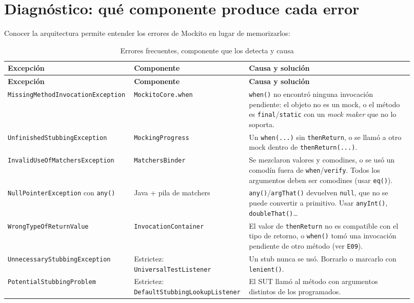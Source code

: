 \documentclass[11pt,a4paper,oneside]{report}
\newcommand{\code}[1]{\texttt{#1}}
\begin{document}
\section{Diagnóstico: qué componente produce cada error}
Conocer la arquitectura permite entender los errores de Mockito en lugar de memorizarlos:

\begin{longtable}{>{\raggedright\arraybackslash}p{0.29\linewidth}>{\raggedright\arraybackslash}p{0.23\linewidth}>{\raggedright\arraybackslash}p{0.4\linewidth}}
\caption{Errores frecuentes, componente que los detecta y causa}\\
\toprule
\textbf{Excepción} & \textbf{Componente} & \textbf{Causa y solución}\\
\midrule
\endfirsthead
\toprule
\textbf{Excepción} & \textbf{Componente} & \textbf{Causa y solución}\\
\midrule
\endhead
\code{MissingMethod\allowbreak Invocation\allowbreak Exception} & \code{MockitoCore.when} & \code{when()} no encontró ninguna invocación pendiente: el objeto no es un mock, o el método es \code{final}/\code{static} con un \emph{mock maker} que no lo soporta.\\
\code{UnfinishedStubbing\allowbreak Exception} & \code{MockingProgress} & Un \code{when(...)} sin \code{thenReturn}, o se llamó a otro mock dentro de \code{thenReturn(...)}.\\
\code{InvalidUseOfMatchers\allowbreak Exception} & \code{MatchersBinder} & Se mezclaron valores y comodines, o se usó un comodín fuera de \code{when}/\code{verify}. Todos los argumentos deben ser comodines (usar \code{eq()}).\\
\code{NullPointerException} con \code{any()} & Java + pila de matchers & \code{any()}/\code{argThat()} devuelven \code{null}, que no se puede convertir a primitivo. Usar \code{anyInt()}, \code{doubleThat()}\ldots\\
\code{WrongTypeOfReturnValue} & \code{InvocationContainer} & El valor de \code{thenReturn} no es compatible con el tipo de retorno, o \code{when()} tomó una invocación pendiente de otro método (ver \code{E09}).\\
\code{UnnecessaryStubbing\allowbreak Exception} & Estrictez: \code{UniversalTestListener} & Un stub nunca se usó. Borrarlo o marcarlo con \code{lenient()}.\\
\code{PotentialStubbing\allowbreak Problem} & Estrictez: \code{DefaultStubbingLookupListener} & El SUT llamó al método con argumentos distintos de los programados.\\

\end{longtable}
\end{document}
